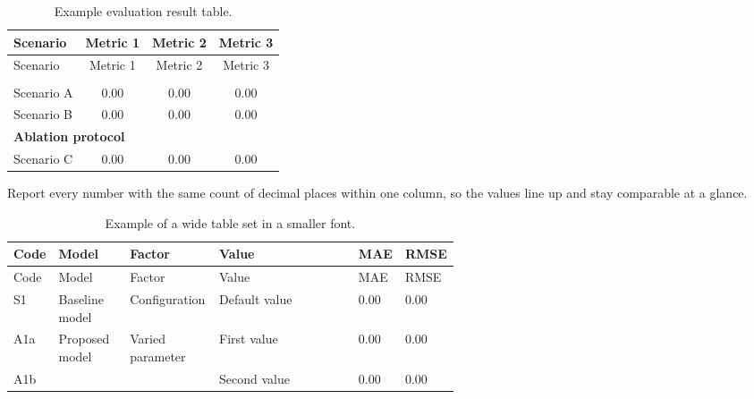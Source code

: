 %
%
\begin{longtable}{|l|c|c|c|}
\caption{Example evaluation result table.}\label{tab:evaluation-results}\\
\hline
Scenario & Metric 1 & Metric 2 & Metric 3 \\
\hline
\endfirsthead
\hline
Scenario & Metric 1 & Metric 2 & Metric 3 \\
\hline
\endhead
\hline
\endlastfoot
\multicolumn{4}{|l|}{\textbf{Main evaluation protocol}} \\
\hline
Scenario A & 0.00 & 0.00 & 0.00 \\
\hline
Scenario B & 0.00 & 0.00 & 0.00 \\
\hline
\multicolumn{4}{|l|}{\textbf{Ablation protocol}} \\
\hline
Scenario C & 0.00 & 0.00 & 0.00 \\
\end{longtable}

Report every number with the same count of decimal places within one column, so the values line up and stay comparable at a glance.

%
%
\begingroup\footnotesize\setlength{\tabcolsep}{4pt}
\begin{xltabular}{\linewidth}{|P{0.06\linewidth}|P{0.16\linewidth}|P{0.20\linewidth}|Y|P{0.08\linewidth}|P{0.08\linewidth}|}
\caption{Example of a wide table set in a smaller font.}\label{tab:wide-results}\\
\hline
Code & Model & Factor & Value & MAE & RMSE \\
\hline
\endfirsthead
\hline
Code & Model & Factor & Value & MAE & RMSE \\
\hline
\endhead
\hline
\endlastfoot
S1 & Baseline model & Configuration & Default value & 0.00 & 0.00 \\
\hline
A1a & Proposed model & Varied parameter & First value & 0.00 & 0.00 \\
A1b & & & Second value & 0.00 & 0.00 \\
\end{xltabular}\endgroup

